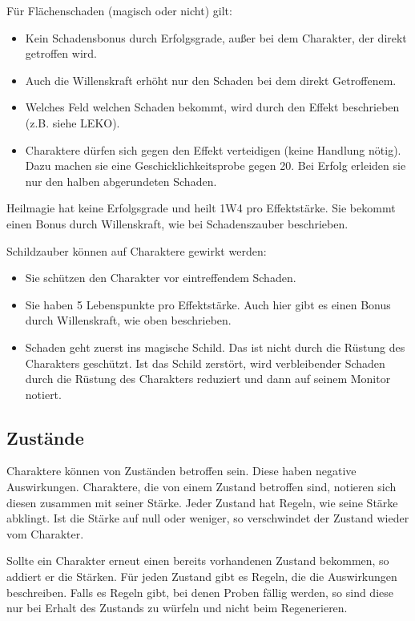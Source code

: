 \documentclass{article}
\begin{document}
Für Flächenschaden (magisch oder nicht) gilt:

\begin{itemize}
\item Kein Schadensbonus durch Erfolgsgrade, außer bei dem Charakter, der direkt getroffen wird.
\item Auch die Willenskraft erhöht nur den Schaden bei dem direkt Getroffenem.
\item Welches Feld welchen Schaden bekommt, wird durch den Effekt beschrieben (z.B. siehe LEKO).
\item Charaktere dürfen sich gegen den Effekt verteidigen (keine Handlung nötig). Dazu machen sie eine Geschicklichkeitsprobe gegen 20. Bei Erfolg erleiden sie nur den halben abgerundeten Schaden.
\end{itemize}

Heilmagie hat keine Erfolgsgrade und heilt 1W4 pro Effektstärke. Sie bekommt einen Bonus durch Willenskraft, wie
bei Schadenszauber beschrieben.

Schildzauber können auf Charaktere gewirkt werden:

\begin{itemize}
\item Sie schützen den Charakter vor eintreffendem Schaden.
\item Sie haben 5 Lebenspunkte pro Effektstärke. Auch hier gibt es einen Bonus durch Willenskraft, wie oben beschrieben.
\item Schaden geht zuerst ins magische Schild. Das ist nicht durch die Rüstung des Charakters geschützt. Ist das Schild zerstört, wird verbleibender Schaden durch die Rüstung des Charakters reduziert und dann auf seinem Monitor notiert.
\end{itemize}

\begin{center}
\subsection{Zustände}
\end{center}

Charaktere können von Zuständen betroffen sein. Diese haben negative Auswirkungen. Charaktere, die von einem
Zustand betroffen sind, notieren sich diesen zusammen mit seiner Stärke. Jeder Zustand hat Regeln, wie seine Stärke
abklingt. Ist die Stärke auf null oder weniger, so verschwindet der Zustand wieder vom Charakter.

Sollte ein Charakter erneut einen bereits vorhandenen Zustand bekommen, so addiert er die Stärken. Für jeden Zustand
gibt es Regeln, die die Auswirkungen beschreiben. Falls es Regeln gibt, bei denen Proben fällig werden, so sind diese nur
bei Erhalt des Zustands zu würfeln und nicht beim Regenerieren.
\end{document}

